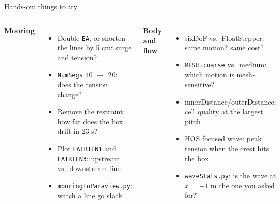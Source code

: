 \documentclass[aspectratio=169,10pt]{beamer}
\newcommand{\file}[1]{{\leavevmode\ttfamily\color{deep}#1}}
\newcommand{\key}[1]{{\leavevmode\ttfamily\color{sea}#1}}
\begin{document}
{
 \renewcommand{\key}[1]{{\leavevmode\ttfamily\color{sand}#1}}
 \renewcommand{\file}[1]{{\leavevmode\ttfamily\color{sand}#1}}
\begin{frame}[plain]{Hands-on: things to try}
  \small
  \begin{columns}[T]
    \color{foam}
    {\color{sand}\bfseries Mooring}
    \begin{itemize}
      \item Double \texttt{EA}, or shorten the lines by 5 cm: surge and tension?
      \item \texttt{NumSegs} 40 $\rightarrow$ 20: does the tension change?
      \item Remove the restraint: how far does the box drift in 23 s?
      \item Plot \texttt{FAIRTEN1} and \texttt{FAIRTEN3}: upstream vs.\ downstream line
      \item \texttt{mooringToParaview.py}: watch a line go slack
    \end{itemize}
    \color{foam}
    {\color{sand}\bfseries Body and flow}
    \begin{itemize}
      \item sixDoF vs.\ FloatStepper: same motion? same cost?
      \item \texttt{MESH=coarse} vs.\ medium: which motion is mesh-sensitive?
      \item \key{innerDistance}/\key{outerDistance}: cell quality at the largest pitch
      \item HOS focused wave: peak tension when the crest hits the box
      \item \texttt{waveStats.py}: is the wave at $x$ = $-1$ m the one you asked for?
    \end{itemize}
  \end{columns}
\end{frame}}
\end{document}
